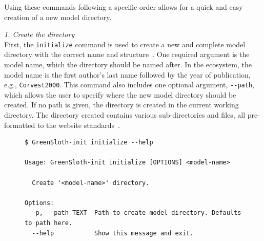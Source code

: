 Using these commands following a specific order allows for a quick and easy creation of a new model directory.

\emph{1. Create the directory}\\
First, the \verb|initialize| command is used to create a new and complete model directory with the correct name and structure~. One required argument is the model name, which the directory should be named after. In the \greensloth{} ecosystem, the model name is the first author's last name followed by the year of publication, e.g., \texttt{Corvest2000}. This command also includes one optional argument, \verb|--path|, which allows the user to specify where the new model directory should be created. If no path is given, the directory is created in the current working directory. The directory created contains various sub-directories and files, all pre-formatted to the \greensloth{} website standards~.

\begin{figure}
\begin{lstlisting}[style=bashstyle, caption={\textbf{The initialize command of the CLI of \greensloth[GreenSlothUtils]}}, label={code:greenslothutils-init}]
$ GreenSloth-init initialize --help

Usage: GreenSloth-init initialize [OPTIONS] <model-name>

  Create '<model-name>' directory.

Options:
  -p, --path TEXT  Path to create model directory. Defaults to path here.
  --help           Show this message and exit.
\end{lstlisting}
\end{figure}

\begin{figure}[ht]
    \centering
    \begin{minipage}{0.3\textwidth}
    \end{minipage}
    \label{dir:greenslothutils-init}
\end{figure}


